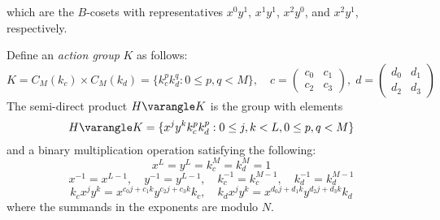 which are the $B$-cosets with representatives $x^0y^1$,
$x^1y^1$, $x^2y^0$, and $x^2y^1$, respectively.

Define an \emph{action group} $K$ as follows:
\[
K = C_M(k_c)\times C_M(k_d) = \{k_c^p k_d^q : 0 \leq p,q < M\}, \quad
c = \begin{pmatrix} c_0 & c_1 \\ c_2 & c_3 \end{pmatrix}, \;
d = \begin{pmatrix} d_0 & d_1 \\ d_2 & d_3 \end{pmatrix}
\]
The semi-direct product $H\varangle K$ is the group with elements
\[
H\varangle K = \{x^j y^k k_c^p k_d^p : 0 \leq j,k < L, 0 \leq p, q < M\}
\]
and a binary multiplication operation satisfying the following:
\[
x^L = y^L = k_c^M = k_d^M = 1
\]
\[
x^{-1} = x^{L-1}, \quad y^{-1}= y^{L-1}, \quad k_c^{-1} = k_c^{M-1}, \quad k_d^{-1} = k_d^{M-1}
\]
\[
k_c x^j y^k = x^{c_0 j + c_1 k} y^{c_2 j + c_3 k} k_c, \quad
k_d x^j y^k = x^{d_0 j + d_1 k} y^{d_2 j + d_3 k} k_d
\]
where the summands in the exponents are modulo $N$.

